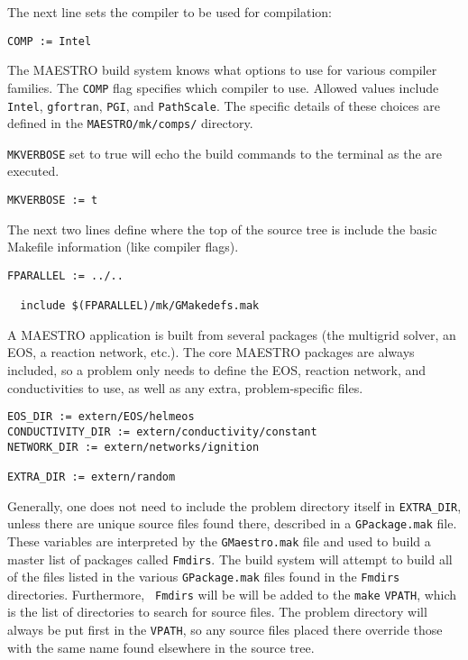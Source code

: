 The next line sets the compiler to be used for compilation:
\begin{lstlisting}[language={[gnu]make},mathescape=false]
  COMP := Intel
\end{lstlisting}
The MAESTRO build system knows what options to use for various
compiler families.  The {\tt COMP} flag specifies which compiler to
use.  Allowed values include {\tt Intel}, {\tt gfortran}, {\tt PGI},
and {\tt PathScale}.  The specific details of these choices are
defined in the {\tt MAESTRO/mk/comps/} directory.

{\tt MKVERBOSE} set to true will echo the build commands to the
terminal as the are executed.
\begin{lstlisting}[language={[gnu]make},mathescape=false]
  MKVERBOSE := t
\end{lstlisting}

The next two lines define where the top of the source tree is
include the basic Makefile information (like compiler
flags).
\begin{lstlisting}[language={[gnu]make},mathescape=false]
  FPARALLEL := ../..

  include $(FPARALLEL)/mk/GMakedefs.mak
\end{lstlisting}

A MAESTRO application is built from several packages (the
multigrid solver, an EOS, a reaction network, etc.).  The core
MAESTRO packages are always included, so a problem only needs
to define the EOS, reaction network, and conductivities to
use, as well as any extra, problem-specific files.  
\begin{lstlisting}[language={[gnu]make},mathescape=false]
EOS_DIR := extern/EOS/helmeos   
CONDUCTIVITY_DIR := extern/conductivity/constant
NETWORK_DIR := extern/networks/ignition

EXTRA_DIR := extern/random
\end{lstlisting}
Generally, one does not need to include the problem directory itself
in {\tt EXTRA\_DIR}, unless there are unique source files found there,
described in a {\tt GPackage.mak} file.  These variables are
interpreted by the {\tt GMaestro.mak} file and used to build a master
list of packages called {\tt Fmdirs}.  The build system will attempt
to build all of the files listed in the various {\tt GPackage.mak}
files found in the {\tt Fmdirs} directories.  Furthermore, {\tt
  Fmdirs} will be will be added to the {\tt make} {\tt VPATH}, which
is the list of directories to search for source files.  The problem
directory will always be put first in the {\tt VPATH}, so any source
files placed there override those with the same name found elsewhere
in the source tree.  


